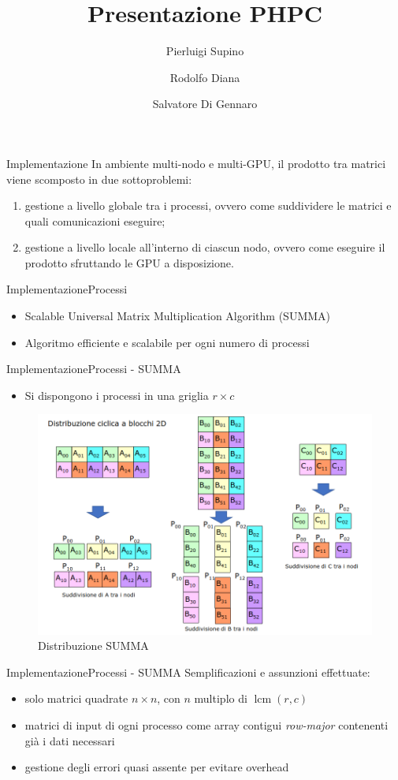 \documentclass{beamer}
\title{Presentazione PHPC}
\author{Pierluigi Supino \and Rodolfo Diana \and Salvatore Di Gennaro}
\DeclareMathOperator{\lcm}{lcm}
\begin{document}
\begin{frame}
    \titlepage
\end{frame}

\begin{frame}{Implementazione}
    In ambiente multi-nodo e multi-GPU, il prodotto tra matrici viene scomposto in due sottoproblemi:
    \begin{enumerate}
        \item gestione a livello globale tra i processi, ovvero come suddividere le matrici e quali comunicazioni eseguire;
        \item gestione a livello locale all'interno di ciascun nodo, ovvero come eseguire il prodotto sfruttando le GPU a disposizione.
    \end{enumerate}
\end{frame}

\begin{frame}{Implementazione}{Processi}
    \begin{itemize}
        \item Scalable Universal Matrix Multiplication Algorithm (SUMMA)
        \item Algoritmo efficiente e scalabile per ogni numero di processi
    \end{itemize}
\end{frame}

\begin{frame}{Implementazione}{Processi - SUMMA}
    \begin{itemize}
        \item Si dispongono i processi in una griglia $r \times c$
    \end{itemize}
    \begin{figure}
        \includegraphics[width=0.5\linewidth]{imgs/summa.png}
        \caption{Distribuzione SUMMA}
    \end{figure}
\end{frame}

\begin{frame}{Implementazione}{Processi - SUMMA}
    Semplificazioni e assunzioni effettuate:
    \begin{itemize}
        \item solo matrici quadrate $n \times n$, con $n$ multiplo di $\lcm(r,c)$
        \item matrici di input di ogni processo come array contigui \textit{row-major} contenenti già i dati necessari
        \item gestione degli errori quasi assente per evitare overhead
    \end{itemize}
\end{frame}
\end{document}
